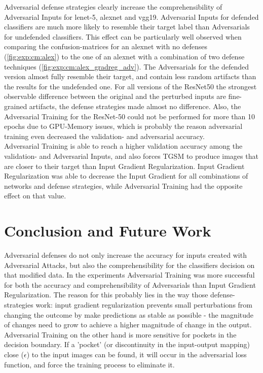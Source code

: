 \documentclass[draft,final]{vutinfth} %
\begin{document}
Adversarial defense strategies clearly increase the comprehensibility of Adversarial Inputs for lenet-5, alexnet and vgg19.
Adversarial Inputs for defended classifiers are much more likely to resemble their target label than Adversarials for undefended classifiers.
This effect can be particularly well observed when comparing the confusion-matrices for an alexnet with no defenses (\ref{fig:exp:cm:alex}) to the one of an alexnet with a combination of two defense techniques (\ref{fig:exp:cm:alex_gradreg_adv}).
The Adversarials for the defended version almost fully resemble their target, and contain less random artifacts than the results for the undefended one.
For all versions of the ResNet50 the strongest observable difference between the original and the perturbed inputs are fine-grained artifacts, the defense strategies made almost no difference.
Also, the Adversarial Training for the ResNet-50 could not be performed for more than 10 epochs due to GPU-Memory issues, which is probably the reason adversarial training even decreased the validation- and adversarial accuracy.
\\
Adversarial Training is able to reach a higher validation accuracy among the validation- and Adversarial Inputs, and also forces TGSM to produce images that are closer to their target than Input Gradient Regularization.
Input Gradient Regularization was able to decrease the Input Gradient for all combinations of networks and defense strategies, while Adversarial Training had the opposite effect on that value.


\chapter{Conclusion and Future Work}

Adversarial defenses do not only increase the accuracy for inputs created with Adversarial Attacks, but also the comprehensibility for the classifiers decision on that modified data. 
In the experiments Adversarial Training was more successful for both the accuracy and comprehensibility of Adversarials than Input Gradient Regularization.
The reason for this probably lies in the way those defense-strategies work: input gradient regularization prevents small perturbations from changing the outcome by make predictions as stable as possible - the magnitude of changes need to grow to achieve a higher magnitude of change in the output.
Adversarial Training on the other hand is more sensitive for pockets in the decision boundary.
If a 'pocket' (or discontinuity in the input-output mapping) close ($\epsilon$) to the input images can be found, it will occur in the adversarial loss function, and force the training process to eliminate it.
\end{document}
